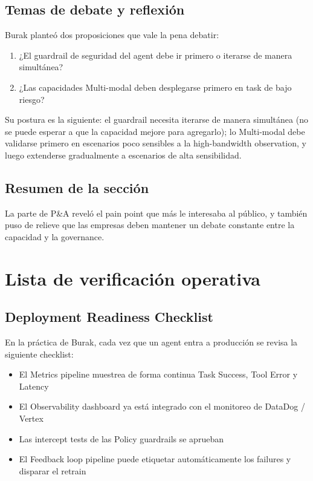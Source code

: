 \documentclass[a4paper]{article}
\begin{document}
\subsection{Temas de debate y reflexión}

Burak planteó dos proposiciones que vale la pena debatir:

\begin{enumerate}
    \item ¿El guardrail de seguridad del agent debe ir primero o iterarse de manera simultánea?
    \item ¿Las capacidades Multi-modal deben desplegarse primero en task de bajo riesgo?
\end{enumerate}

Su postura es la siguiente: el guardrail necesita iterarse de manera simultánea (no se puede esperar a que la capacidad mejore para agregarlo); lo Multi-modal debe validarse primero en escenarios poco sensibles a la high-bandwidth observation, y luego extenderse gradualmente a escenarios de alta sensibilidad.

\subsection{Resumen de la sección}

La parte de P\&A reveló el pain point que más le interesaba al público, y también puso de relieve que las empresas deben mantener un debate constante entre la capacidad y la governance.

\section{Lista de verificación operativa}

\subsection{Deployment Readiness Checklist}

En la práctica de Burak, cada vez que un agent entra a producción se revisa la siguiente checklist:

\begin{itemize}
    \item El Metrics pipeline muestrea de forma continua Task Success, Tool Error y Latency
    \item El Observability dashboard ya está integrado con el monitoreo de DataDog / Vertex
    \item Las intercept tests de las Policy guardrails se aprueban
    \item El Feedback loop pipeline puede etiquetar automáticamente los failures y disparar el retrain
\end{itemize}
\end{document}
